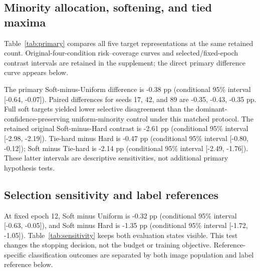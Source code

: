 \subsection{Minority allocation, softening, and tied maxima}
Table~\ref{tab:primary} compares all five target representations at the same retained count. Original-four-condition risk--coverage curves and selected/fixed-epoch contrast intervals are retained in the supplement; the direct primary difference curve appears below.

The primary Soft-minus-Uniform difference is -0.38 pp (conditional 95\% interval [-0.64, -0.07]). Paired differences for seeds 17, 42, and 89 are -0.35, -0.43, -0.35 pp. Full soft targets yielded lower selective disagreement than the dominant-confidence-preserving uniform-minority control under this matched protocol. The retained original Soft-minus-Hard contrast is -2.61 pp (conditional 95\% interval [-2.98, -2.19]). Tie-hard minus Hard is -0.47 pp (conditional 95\% interval [-0.80, -0.12]); Soft minus Tie-hard is -2.14 pp (conditional 95\% interval [-2.49, -1.76]). These latter intervals are descriptive sensitivities, not additional primary hypothesis tests.


\subsection{Selection sensitivity and label references}

At fixed epoch 12, Soft minus Uniform is -0.32 pp (conditional 95\% interval [-0.63, -0.05]), and Soft minus Hard is -1.35 pp (conditional 95\% interval [-1.72, -1.05]). Table~\ref{tab:sensitivity} keeps both evaluation states visible. This test changes the stopping decision, not the budget or training objective. Reference-specific classification outcomes are separated by both image population and label reference below.

